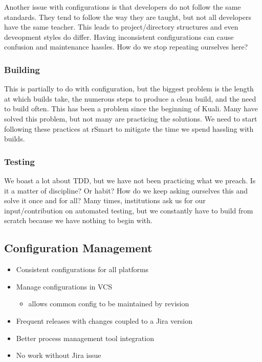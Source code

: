\documentclass[12pt,notitlepage]{article}
\begin{document}
Another issue with configurations is that developers do not follow the
same standards. They tend to follow the way they are taught, but not
all developers have the same teacher. This leads to project/directory
structures and even deveopment styles do differ. Having inconsistent
configurations can cause confusion and maintenance hassles. How do we
stop repeating ourselves here?

\subsubsection{Building}
This is partially to do with configuration, but the biggest problem is
the length at which builds take, the numerous steps to produce a clean
build, and the need to build often. This has been a problem since the
beginning of Kuali. Many have solved this problem, but not many are
practicing the solutions. We need to start following these practices
at rSmart to mitigate the time we spend hassling with builds.

\subsubsection{Testing}
We boast a lot about TDD, but we have not been practicing what we
preach. Is it a matter of discipline? Or habit? How do we keep asking
ourselves this and solve it once and for all? Many times, institutions
ask us for our input/contribution on automated testing, but we
constantly have to build from scratch because we have nothing to
begin with.

\subsection{Configuration Management}
\begin{itemize}
  \item Consistent configurations for all platforms
  \item Manage configurations in VCS
    \begin{itemize}
      \item allows common config to be maintained by revision
      \end{itemize}
    \item Frequent releases with changes coupled to a Jira version
    \item Better process management tool integration
    \item No work without Jira issue
\end{itemize}
\end{document}
